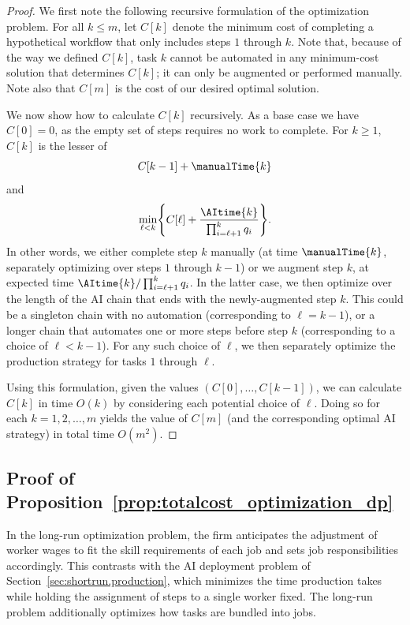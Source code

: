 \begin{proof}
We first note the following recursive formulation of the optimization problem.
For all $k \leq m$, let $C[k]$ denote the minimum cost of completing a hypothetical workflow that only includes steps $1$ through $k$.
Note that, because of the way we defined $C[k]$, task $k$ cannot be automated in any minimum-cost solution that determines $C[k]$; it can only be augmented or performed manually.
Note also that $C[m]$ is the cost of our desired optimal solution.

We now show how to calculate $C[k]$ recursively.
As a base case we have $C[0] = 0$, as the empty set of steps requires no work to complete.
For $k \geq 1$, $C[k]$ is the lesser of
\[ C[k-1] + \manualTime{k} \]
and
\[ \min_{\ell < k} \Biggl\{ C[\ell] + \frac{\AItime{k}}{\prod_{i=\ell+1}^k q_i} \Biggr\}.
\]
In other words, we either complete step $k$ manually (at time $\manualTime{k}$, separately optimizing over steps $1$ through $k-1$) or we augment step $k$, at expected time $\AItime{k}/\prod_{i=\ell+1}^k q_i$.
In the latter case, we then optimize over the length of the AI chain that ends with the newly-augmented step $k$.
This could be a singleton chain with no automation (corresponding to $\ell = k-1$), or a longer chain that automates one or more steps before step $k$ (corresponding to a choice of $\ell < k-1$).
For any such choice of $\ell$, we then separately optimize the production strategy for tasks $1$ through $\ell$.

Using this formulation, given the values $(C[0], \dotsc, C[k-1])$, we can calculate $C[k]$ in time $O(k)$ by considering each potential choice of $\ell$.
Doing so for each $k = 1, 2, \dotsc, m$ yields the value of $C[m]$ (and the corresponding optimal AI strategy) in total time $O(m^2)$.
\end{proof}

\subsection{Proof of Proposition~\ref{prop:totalcost_optimization_dp}}
\label{app:jobdesign.longrun}

In the long-run optimization problem, the firm anticipates the adjustment of worker wages to fit the skill requirements of each job and sets job responsibilities accordingly.
This contrasts with the AI deployment problem of Section~\ref{sec:shortrun.production}, which minimizes the time production takes while holding the assignment of steps to a single worker fixed. 
The long-run problem additionally optimizes how tasks are bundled into jobs.

